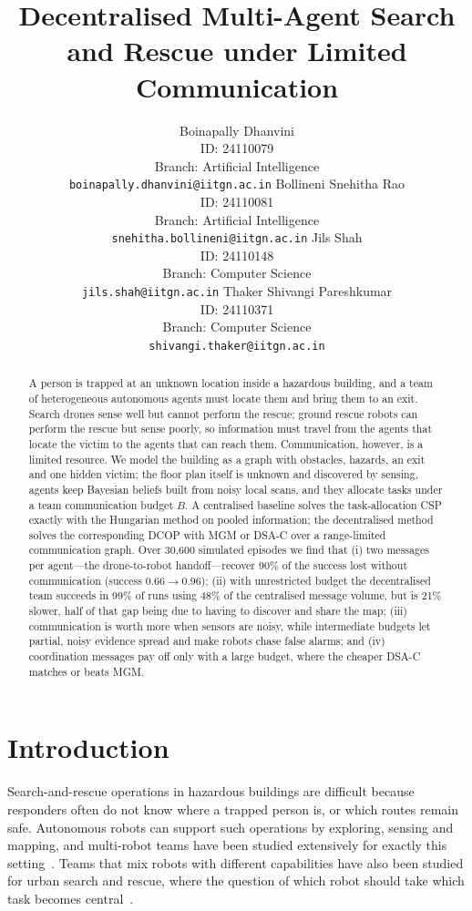 \documentclass{article}
\title{Decentralised Multi-Agent Search and Rescue under Limited Communication}
\author{
Boinapally Dhanvini\\
ID: 24110079\\
Branch: Artificial Intelligence\\
\texttt{boinapally.dhanvini@iitgn.ac.in}
\And
Bollineni Snehitha Rao\\
ID: 24110081\\
Branch: Artificial Intelligence\\
\texttt{snehitha.bollineni@iitgn.ac.in}
\And
Jils Shah\\
ID: 24110148\\
Branch: Computer Science\\
\texttt{jils.shah@iitgn.ac.in}
\AND
Thaker Shivangi Pareshkumar\\
ID: 24110371\\
Branch: Computer Science\\
\texttt{shivangi.thaker@iitgn.ac.in}
}
\begin{document}
\maketitle

\begin{abstract}
A person is trapped at an unknown location inside a hazardous building, and a team of heterogeneous
autonomous agents must locate them and bring them to an exit. Search drones sense well but cannot
perform the rescue; ground rescue robots can perform the rescue but sense poorly, so information
must travel from the agents that locate the victim to the agents that can reach them. Communication,
however, is a limited resource. We model the building as a graph with obstacles, hazards, an exit and one
hidden victim; the floor plan itself is unknown and discovered by sensing, agents keep Bayesian beliefs built from
noisy local scans, and they allocate tasks under a team communication budget $B$. A centralised baseline solves the
task-allocation CSP exactly with the Hungarian method on pooled information; the decentralised method solves the
corresponding DCOP with MGM or DSA-C over a range-limited communication graph. Over 30{,}600 simulated episodes we
find that (i) two messages per agent---the drone-to-robot handoff---recover 90\% of the success lost without
communication (success $0.66\!\to\!0.96$); (ii) with unrestricted budget the decentralised team succeeds in 99\% of
runs using 48\% of the centralised message volume, but is 21\% slower, half of that gap being due to having to discover
and share the map; (iii) communication is worth more when sensors are noisy, while intermediate budgets let partial,
noisy evidence spread and make robots chase false alarms; and (iv) coordination messages pay off only with a large
budget, where the cheaper DSA-C matches or beats MGM.
\end{abstract}


\section{Introduction}
Search-and-rescue operations in hazardous buildings are difficult because responders often do not know where a trapped
person is, or which routes remain safe. Autonomous robots can support such operations by exploring, sensing and
mapping, and multi-robot teams have been studied extensively for exactly this setting~\cite{queralta2020}. Teams that mix
robots with different capabilities have also been studied for urban search and rescue, where the question of which robot
should take which task becomes central~\cite{gunn2015}.
\end{document}
